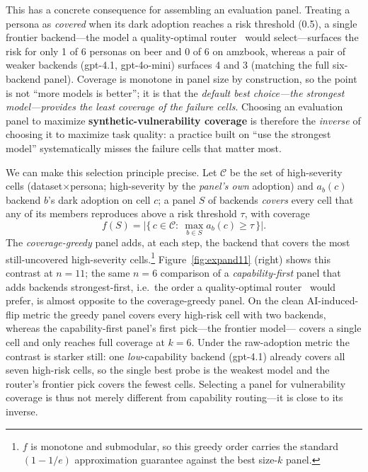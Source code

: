 \documentclass[manuscript,review,anonymous]{acmart}
\begin{document}
This has a concrete consequence for assembling an evaluation panel. Treating a persona as \emph{covered}
when its dark adoption reaches a risk threshold (0.5), a single frontier backend---the model a
quality-optimal router~\cite{ong2025routellm} would select---surfaces the risk for only
1 of 6 personas on beer and 0 of 6 on amzbook, whereas a pair of weaker backends (gpt-4.1, gpt-4o-mini)
surfaces 4 and 3 (matching the full six-backend panel). Coverage is monotone in panel size by construction,
so the point is not ``more models is better''; it is that the \emph{default best choice---the strongest
model---provides the least coverage of the failure cells}. Choosing an evaluation panel to maximize \textbf{synthetic-vulnerability coverage} is
therefore the \emph{inverse} of choosing it to maximize task quality: a practice built on ``use the
strongest model'' systematically misses the failure cells that matter most.

We can make this selection principle precise. Let $\mathcal{C}$ be the set of high-severity cells
(dataset$\times$persona; high-severity by the \emph{panel's own} adoption)
and $a_b(c)$ backend $b$'s dark adoption on cell $c$; a panel $S$ of backends
\emph{covers} every cell that any of its members reproduces above a risk threshold $\tau$, with coverage
\begin{equation}
f(S)=\bigl|\{\,c\in\mathcal{C}:\ \textstyle\max_{b\in S} a_b(c)\ge\tau\,\}\bigr|.
\end{equation}
The \emph{coverage-greedy} panel adds, at each step, the backend that covers the most still-uncovered
high-severity cells.\footnote{$f$ is monotone and submodular, so this greedy order carries the standard
$(1-1/e)$ approximation guarantee against the best size-$k$ panel.}
Figure~\ref{fig:expand11} (right) shows this contrast at $n{=}11$; the same $n{=}6$ comparison of a
\emph{capability-first} panel that adds
backends strongest-first, i.e.\ the order a quality-optimal router~\cite{ong2025routellm}
would prefer, is almost opposite to the coverage-greedy panel. On the clean AI-induced-flip metric the greedy panel covers every
high-risk cell with two backends, whereas the capability-first panel's first pick---the frontier model---
covers a single cell and only reaches full coverage at $k=6$. Under the raw-adoption metric the contrast is
starker still: one \emph{low}-capability backend (gpt-4.1) already covers all seven high-risk cells, so the
single best probe is the weakest model and the router's frontier pick covers the fewest cells. Selecting a panel for
vulnerability coverage is thus not merely different from capability routing---it is close to its inverse.
\end{document}
